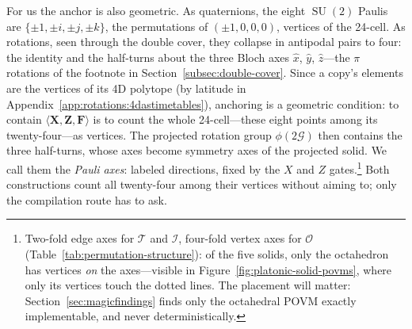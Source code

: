 \documentclass[11pt, oneside, openany]{scrbook}
\DeclareMathOperator{\SU}{SU}
\newcommand{\Tgroup}{\mathcal{T}}  %
\newcommand{\Ogroup}{\mathcal{O}}  %
\newcommand{\Igroup}{\mathcal{I}}  %
\newcommand{\Ggroup}{\mathcal{G}}
\newcommand{\TwoG}{2\Ggroup}
\begin{document}
For us the anchor is also geometric. As quaternions, the eight $\SU(2)$ Paulis are $\{\pm 1, \pm i, \pm j, \pm k\}$, the permutations of $(\pm 1, 0, 0, 0)$, vertices of the 24-cell. As rotations, seen through the double cover, they collapse in antipodal pairs to four: the identity and the half-turns about the three Bloch axes $\hat x$, $\hat y$, $\hat z$---the $\pi$ rotations of the footnote in Section~\ref{subsec:double-cover}. Since a copy's elements are the vertices of its 4D polytope (by latitude in Appendix~\ref{app:rotations:4dastimetables}), anchoring is a geometric condition: to contain $\langle \mathbf{X}, \mathbf{Z}, \mathbf{F} \rangle$ is to count the whole 24-cell---these eight points among its twenty-four---as vertices. The projected rotation group $\phi(\TwoG)$ then contains the three half-turns, whose axes become symmetry axes of the projected solid. We call them the \textit{Pauli axes}: labeled directions, fixed by the $X$ and $Z$ gates.\footnote{Two-fold edge axes for $\Tgroup$ and $\Igroup$, four-fold vertex axes for $\Ogroup$ (Table~\ref{tab:permutation-structure}): of the five solids, only the octahedron has vertices \textit{on} the axes---visible in Figure~\ref{fig:platonic-solid-povms}, where only its vertices touch the dotted lines. The placement will matter: Section~\ref{sec:magicfindings} finds only the octahedral POVM exactly implementable, and never deterministically.} Both constructions count all twenty-four among their vertices without aiming to; only the compilation route has to ask.
\end{document}
